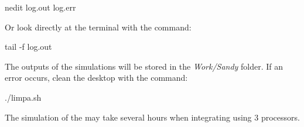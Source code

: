 \begin{bashcode}
nedit log.out log.err
\end{bashcode}
\bigskip

\noindent Or look directly at the terminal with the command:
\bigskip

\begin{bashcode}
tail -f log.out
\end{bashcode}
\bigskip

\noindent The outputs of the simulations will be stored in the \textit{Work/Sandy} folder. If an error occurs, clean the desktop with the command:
\bigskip

\begin{bashcode}
./limpa.sh
\end{bashcode}
\bigskip


\begin{tcolorbox}[enhanced,
  grow to left by=0cm,%
  grow to right by=0cm,%
  enlarge top by=0cm,%
  enlarge bottom by=0cm,%
  tcbox raise base,
  boxrule=1.0pt,
  left=18mm,
  colframe=red!50!black,coltext=red!25!black,colback=red!10!white,
  overlay={\begin{tcbclipinterior}\fill[red!75!blue!50!white] (frame.south west)
    rectangle node[text=white,font=\sffamily\bfseries\footnotesize,rotate=0] {WARNING} ([xshift=18mm]frame.north west);\end{tcbclipinterior}}]
    The simulation of the may take several hours when integrating using 3 processors.
\end{tcolorbox}
\bigskip
